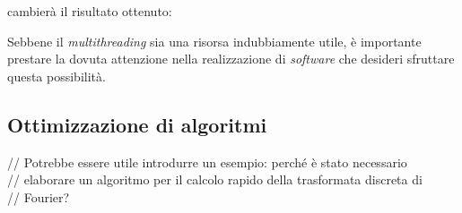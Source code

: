 cambierà il risultato ottenuto:
\begin{table}[htbp]
  \centering
  \qquad\qquad 
\end{table}
Sebbene il \emph{multithreading} sia una risorsa indubbiamente utile, è
importante prestare la dovuta attenzione nella realizzazione di \emph{software}
che desideri sfruttare questa possibilità.

\subsection{Ottimizzazione di algoritmi}

// Potrebbe essere utile introdurre un esempio: perché è stato necessario \\
// elaborare un algoritmo per il calcolo rapido della trasformata discreta di \\
// Fourier?
